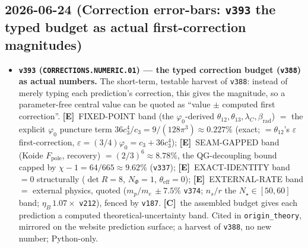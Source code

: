 \documentclass[11pt]{article}
\providecommand{\mE}{\textbf{[E]}}\providecommand{\mC}{\textbf{[C]}}
\providecommand{\vref}[1]{\texttt{#1}}
\begin{document}
\subsection*{2026-06-24 (Correction error-bars: \texttt{v393} the typed budget as actual first-correction magnitudes)}
\begin{itemize}
\item \textbf{\texttt{v393} (\texttt{CORRECTIONS.NUMERIC.01}) --- the typed correction budget (\vref{v388}) as actual
numbers.} The short-term, testable harvest of \vref{v388}: instead of merely typing each prediction's correction, this
gives the magnitude, so a parameter-free central value can be quoted as ``value $\pm$ computed first correction''.
\mE\ FIXED-POINT band (the $\varphi_0$-derived $\theta_{12},\theta_{13},\lambda_C,\beta_{\mathrm{rad}}$) $=$ the explicit
$\varphi_0$ puncture term $36c_3^4/c_3 = 9/(128\pi^3)\approx0.227\%$ (exact; $=\theta_{12}$'s $\varepsilon$
first-correction, $\varepsilon=(3/4)\varphi_0=c_3+36c_3^4$); \mE\ SEAM-GAPPED band (Koide $F_{\mathrm{pole}}$, recovery)
$=(2/3)^6\approx8.78\%$, the QG-decoupling bound capped by $\chi-1=64/665\approx9.62\%$ (\vref{v337}); \mE\
EXACT-IDENTITY band $=0$ structurally ($\det R=8$, $N_\Phi=1$, $\theta_{\mathrm{eff}}=0$); \mE\ EXTERNAL-RATE band $=$
external physics, quoted ($m_p/m_e\,{\pm}7.5\%$ \vref{v374}; $n_s/r$ the $N_\star{\in}[50,60]$ band; $\eta_B\,1.07\times$
\vref{v212}), fenced by \vref{v187}. \mC\ the assembled budget gives each prediction a computed theoretical-uncertainty
band. Cited in \texttt{origin\_theory}, mirrored on the website prediction surface; a harvest of \vref{v388}, no new
number; Python-only.
\end{itemize}
\end{document}
